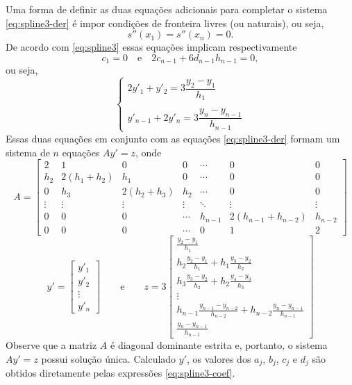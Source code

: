Uma forma de definir as duas equações adicionais para completar o sistema \eqref{eq:spline3-der} é impor condições de fronteira livres (ou naturais), ou seja,
\begin{equation}
s''(x_1)=s''(x_n)=0.
\end{equation}
De acordo com \eqref{eq:spline3} essas equações implicam respectivamente
\begin{equation*}
c_1=0\quad\text{e}\quad 2c_{n-1}+6d_{n-1}h_{n-1}=0,
\end{equation*}
ou seja, 
\begin{equation}
\left\{\begin{array}{l}
2y'_1+y'_2=3\dfrac{y_2-y_1}{h_1}\\
\\
y'_{n-1}+2y'_n=3\dfrac{y_n-y_{n-1}}{h_{n-1}}
\end{array}\right.
\end{equation}
Essas duas equações em conjunto com as equações \eqref{eq:spline3-der} formam um sistema de $n$ equações $Ay'=z$, onde
\begin{equation}
A=\left[\begin{array}{ccccccc}
2 &1&0&0 &\cdots&0&0\\
h_2&2(h_1+h_2)&h_1&0&\cdots&0&0\\
0&h_3&2(h_2+h_3)&h_2&\cdots&0&0\\
\vdots&\vdots&\vdots&\vdots&\ddots&\vdots&\vdots\\
0&0&0&\cdots&h_{n-1} & 2(h_{n-1}+h_{n-2})&h_{n-2}\\
0&0&0&\cdots &0&1&2
\end{array}\right]  
\end{equation}
\begin{equation}
y' = \left[\begin{array}{c}
y'_1\\
y'_2\\
\vdots\\
y'_n
\end{array}\right]\qquad \text{e}\qquad
z = 3\left[\begin{array}{c}
\frac{y_2-y_1}{h_1}\\
h_2\frac{y_2-y_1}{h_1}+h_1\frac{y_3-y_2}{h_2}\\
h_3\frac{y_3-y_2}{h_2}+h_2\frac{y_4-y_3}{h_3}\\
\vdots\\
h_{n-1}\frac{y_{n-1}-y_{n-2}}{h_{n-2}}+h_{n-2}\frac{y_n-y_{n-1}}{h_{n-1}}\\
\frac{y_n-y_{n-1}}{h_{n-1}}
\end{array}\right]
\end{equation}
Observe que a matriz $A$ é diagonal dominante estrita e, portanto, o sistema $Ay'=z$ possui solução única. Calculado $y'$, os valores dos $a_j$, $b_j$, $c_j$ e $d_j$ são obtidos diretamente pelas expressões \eqref{eq:spline3-coef}.

